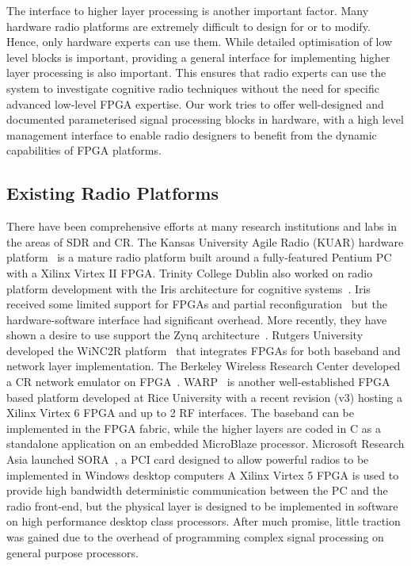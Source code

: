 The interface to higher layer processing is another important factor. Many hardware radio platforms are extremely difficult to design for or to modify. Hence, only hardware experts can use them. While detailed optimisation of low level blocks is important, providing a general interface for implementing higher layer processing is also important. This ensures that radio experts can use the system to investigate cognitive radio techniques without the need for specific advanced low-level FPGA expertise.
Our work tries to offer well-designed and documented parameterised signal processing blocks in hardware, with a high level management interface to enable radio designers to benefit from the dynamic capabilities of FPGA platforms.

\subsection{Existing Radio Platforms}
There have been comprehensive efforts at many research institutions and labs in the areas of SDR and CR.
The Kansas University Agile Radio (KUAR) hardware platform~\cite{Minden2007} is a mature radio platform built around a fully-featured Pentium PC with a Xilinx Virtex II FPGA.
Trinity College Dublin also worked on radio platform development with the Iris architecture for cognitive systems~\cite{Sutton2006}. Iris~\cite{Sutton2010} received some limited support for FPGAs and partial reconfiguration~\cite{fahmy2009,lotze2009} but the hardware-software interface had significant overhead. More recently, they have shown a desire to use support the Zynq architecture~\cite{Belt2013}.
Rutgers University developed the WiNC2R platform~\cite{Miljanic2007} that integrates FPGAs for both baseband and network layer implementation.
The Berkeley Wireless Research Center developed a CR network emulator on FPGA~\cite{So2008}.
WARP~\cite{amiri2007} is another well-established FPGA based platform developed at Rice University with a recent revision (v3) hosting a Xilinx Virtex 6 FPGA and up to 2 RF interfaces. The baseband can be implemented in the FPGA fabric, while the higher layers are coded in C as a standalone application on an embedded MicroBlaze processor.
Microsoft Research Asia launched SORA~\cite{tan2011sora}, a PCI card designed to allow powerful radios to be implemented in Windows desktop computers
A Xilinx Virtex 5 FPGA is used to provide high bandwidth deterministic communication between the PC and the radio front-end, but the physical layer is designed to be implemented in software on high performance desktop class processors.
After much promise, little traction was gained due to the overhead of programming complex signal processing on general purpose processors.

